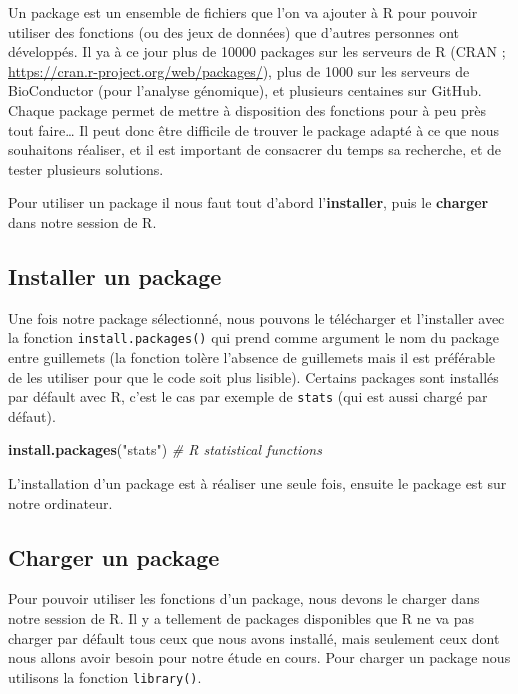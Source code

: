 \documentclass[]{book}
\newenvironment{Shaded}{\begin{snugshade}}{\end{snugshade}}
\newcommand{\KeywordTok}[1]{\textcolor[rgb]{0.13,0.29,0.53}{\textbf{#1}}}
\newcommand{\StringTok}[1]{\textcolor[rgb]{0.31,0.60,0.02}{#1}}
\newcommand{\CommentTok}[1]{\textcolor[rgb]{0.56,0.35,0.01}{\textit{#1}}}
\newcommand{\NormalTok}[1]{#1}
\theoremstyle{definition}
\theoremstyle{definition}
\theoremstyle{definition}
\theoremstyle{remark}
\begin{document}
Un package est un ensemble de fichiers que l'on va ajouter à R pour
pouvoir utiliser des fonctions (ou des jeux de données) que d'autres
personnes ont développés. Il ya à ce jour plus de 10000 packages sur les
serveurs de R (CRAN ; \url{https://cran.r-project.org/web/packages/}),
plus de 1000 sur les serveurs de BioConductor (pour l'analyse
génomique), et plusieurs centaines sur GitHub. Chaque package permet de
mettre à disposition des fonctions pour à peu près tout faire\ldots{} Il
peut donc être difficile de trouver le package adapté à ce que nous
souhaitons réaliser, et il est important de consacrer du temps sa
recherche, et de tester plusieurs solutions.

Pour utiliser un package il nous faut tout d'abord l'\textbf{installer},
puis le \textbf{charger} dans notre session de R.

\subsection{Installer un package}\label{installer-un-package}

Une fois notre package sélectionné, nous pouvons le télécharger et
l'installer avec la fonction \texttt{install.packages()} qui prend comme
argument le nom du package entre guillemets (la fonction tolère
l'absence de guillemets mais il est préférable de les utiliser pour que
le code soit plus lisible). Certains packages sont installés par défault
avec R, c'est le cas par exemple de \texttt{stats} (qui est aussi chargé
par défaut).

\begin{Shaded}
\begin{Highlighting}[]
\KeywordTok{install.packages}\NormalTok{(}\StringTok{"stats"}\NormalTok{) }\CommentTok{# R statistical functions}
\end{Highlighting}
\end{Shaded}

L'installation d'un package est à réaliser une seule fois, ensuite le
package est sur notre ordinateur.

\subsection{Charger un package}\label{charger-un-package}

Pour pouvoir utiliser les fonctions d'un package, nous devons le charger
dans notre session de R. Il y a tellement de packages disponibles que R
ne va pas charger par défault tous ceux que nous avons installé, mais
seulement ceux dont nous allons avoir besoin pour notre étude en cours.
Pour charger un package nous utilisons la fonction \texttt{library()}.
\end{document}
